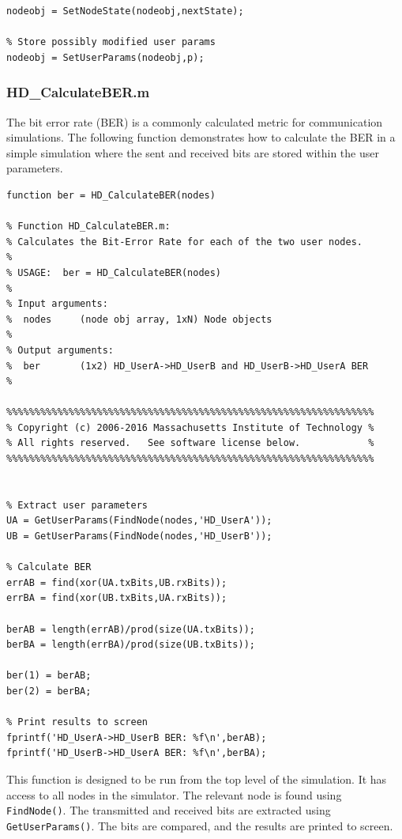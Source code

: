 \begin{lstlisting}[name=hdState]
% Set next state
nodeobj = SetNodeState(nodeobj,nextState);

% Store possibly modified user params
nodeobj = SetUserParams(nodeobj,p);
\end{lstlisting}


\subsubsection{HD\_CalculateBER.m}

The bit error rate (BER) is a commonly calculated metric for
communication simulations.  The following function demonstrates how
to calculate the BER in a simple simulation where the sent and
received bits are stored within the user parameters.

\begin{lstlisting}[name=ber]
function ber = HD_CalculateBER(nodes)

% Function HD_CalculateBER.m:
% Calculates the Bit-Error Rate for each of the two user nodes.
%
% USAGE:  ber = HD_CalculateBER(nodes)
%
% Input arguments:
%  nodes     (node obj array, 1xN) Node objects
%
% Output arguments:
%  ber       (1x2) HD_UserA->HD_UserB and HD_UserB->HD_UserA BER
%

%%%%%%%%%%%%%%%%%%%%%%%%%%%%%%%%%%%%%%%%%%%%%%%%%%%%%%%%%%%%%%%%%
% Copyright (c) 2006-2016 Massachusetts Institute of Technology %
% All rights reserved.   See software license below.            %
%%%%%%%%%%%%%%%%%%%%%%%%%%%%%%%%%%%%%%%%%%%%%%%%%%%%%%%%%%%%%%%%%


% Extract user parameters
UA = GetUserParams(FindNode(nodes,'HD_UserA'));
UB = GetUserParams(FindNode(nodes,'HD_UserB'));

% Calculate BER
errAB = find(xor(UA.txBits,UB.rxBits));
errBA = find(xor(UB.txBits,UA.rxBits));

berAB = length(errAB)/prod(size(UA.txBits));
berBA = length(errBA)/prod(size(UB.txBits));

ber(1) = berAB;
ber(2) = berBA;

% Print results to screen
fprintf('HD_UserA->HD_UserB BER: %f\n',berAB);
fprintf('HD_UserB->HD_UserA BER: %f\n',berBA);
\end{lstlisting}

This function is designed to be run from the top level of the
simulation.  It has access to all nodes in the simulator.  The
relevant node is found using \verb+FindNode()+.  The transmitted and
received bits are extracted using \verb+GetUserParams()+.  The bits
are compared, and the results are printed to screen.

